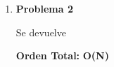 \vspace*{1em}
\begin{enumerate}

\item\textbf{Problema 2}
\par Se devuelve
\par \textbf{Orden Total:} \textbf{O(N)}

\end{enumerate}
